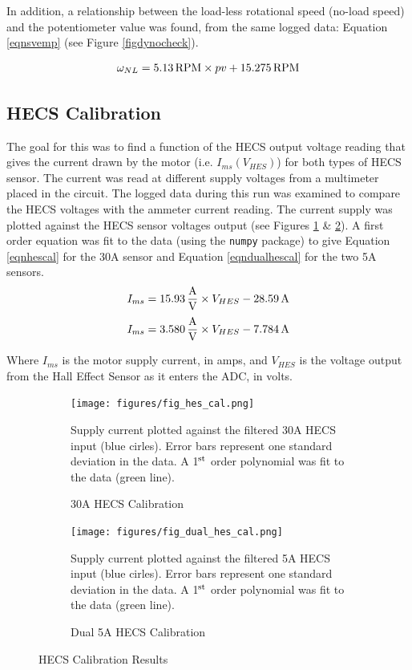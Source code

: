 \documentclass[twoside,a4]{report}
\begin{document}
	\noindent
	In addition, a relationship between the load-less rotational speed (no-load speed) and the potentiometer value was found, from the same logged data: Equation \ref{eqnsvemp} (see Figure \ref{figdynocheck}).
	
	\begin{equation}
	\omega_{NL} = 5.13 {\rm \, RPM} \times pv + 15.275 {\rm \, RPM}
	\label{eqnsvemp}
	\end{equation}
	
	
	\subsection*{HECS Calibration}
	The goal for this was to find a function of the HECS output voltage reading that gives the current drawn by the motor (i.e. \(I_{ms} ({V_{HES}})\)) for both types of HECS sensor. The current was read at different supply voltages from a multimeter placed in the circuit. The logged data during this run was examined to compare the HECS voltages with the ammeter current reading. The current supply was plotted against the HECS sensor voltages output (see Figures \ref{fighes30a} \& \ref{fighes5a}). A first order equation was fit to the data (using the \texttt{numpy} package) to give Equation \ref{eqnhescal} for the 30A sensor and Equation \ref{eqndualhescal} for the two 5A sensors.
	\begin{equation}
	I_{ms} = 15.93 {\rm \, \frac{A}{V}} \times {V_{HES}} - 28.59 {\rm \, A}
	\label{eqnhescal}
	\end{equation}
	\begin{equation}
	I_{ms} = 3.580 {\rm \, \frac{A}{V}} \times {V_{HES}} - 7.784 {\rm \, A}
	\label{eqndualhescal}
	\end{equation}
	
	
	\noindent
	Where \(I_{ms}\) is the motor supply current, in amps, and \(V_{HES}\) is the voltage output from the Hall Effect Sensor as it enters the ADC, in volts.
	
	\begin{figure}[!htb]
		\centering
		\begin{subfigure}[t]{0.45\textwidth}
			\centering
			\texttt{[image: figures/fig\_hes\_cal.png]}
			\caption{30A HECS Calibration}
			\label{fighes30a}
			\footnotesize
			Supply current plotted against the filtered 30A HECS input (blue cirles). Error bars represent one standard deviation in the data. A 1$\rm ^{st}$ order polynomial was fit to the data (green line).
		\end{subfigure}
		\begin{subfigure}[t]{0.45\textwidth}
			\centering
			\texttt{[image: figures/fig\_dual\_hes\_cal.png]}
			\caption{Dual 5A HECS Calibration}
			\label{fighes5a}
			\footnotesize
			Supply current plotted against the filtered 5A HECS input (blue cirles). Error bars represent one standard deviation in the data. A 1$\rm ^{st}$ order polynomial was fit to the data (green line).
		\end{subfigure}
		\label{hescalcomp}
		\caption{HECS Calibration Results}
	\end{figure}
	
\end{document}
